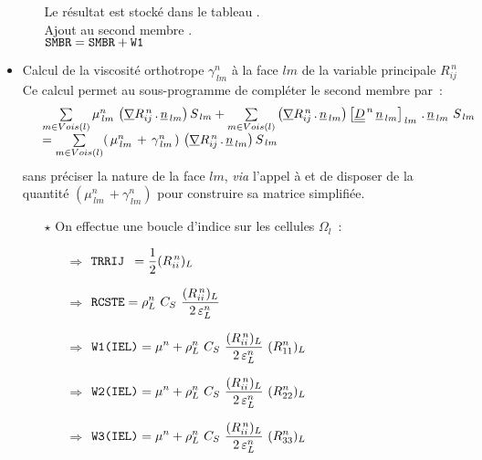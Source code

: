 \begin{itemize}
\begin{itemize}
Le résultat est stocké dans le tableau .\\
Ajout au second membre .\\
$\text{\texttt{SMBR}} = \text{\texttt{SMBR}} + \text{\texttt{W1}}$
\end{itemize}
\item Calcul de la viscosité orthotrope $\gamma^n_{\,lm}$ à la face $lm$ de la variable principale
$R^{\,n}_{ij}$\\
Ce calcul permet au sous-programme  de compléter le second membre
 par~:
\begin{equation}
\begin{array} {ll}
& \sum\limits_{m\in Vois(l)}
\mu^n_{\,lm}\,\left(\underline{\nabla}{R}^{\,n}_{ij}\,.\,\underline{n}_{\,lm}\right)S_{\,lm}
 + \sum\limits_{m\in Vois(l)} \left(\underline{\nabla}{R}^{\,n}_{ij}
\,.\,\underline{n}_{\,lm}\right)\left[\underline{\underline{D}}^{\,n}\,\underline{n}_{\,lm}\right]_{\,lm}\,.\,\underline{n}_{\,lm}\
S_{\,lm}\\
& = \sum\limits_{m\in Vois(l)}(\,\mu^n_{\,lm}\, + \,\gamma^n_{\,lm}\,)\,\left(\underline{\nabla}{R}^{\,n}_{ij}\,.\,\underline{n}_{\,lm}\right)S_{\,lm}
\end{array}
\end{equation}
sans préciser la nature de la face $lm$, {\it via} l'appel à   et de disposer de la quantité
$(\mu^n_{\,lm}\, + \gamma^n_{\,lm})$ pour construire sa
matrice simplifiée.\\
\begin{itemize}
\item [$\star$] On effectue une boucle d'indice  sur les cellules
$\Omega_l$~:
\begin{itemize}
\item [$\Rightarrow$] $\displaystyle \text{\texttt{TRRIJ }}= \frac{1}{2} (R^{\,n}_{ii})_L $
\item [$\Rightarrow$] $\displaystyle \var{RCSTE} = \rho^n_L \ C_S \ \frac{ (R^{\,n}_{ii})_L}{2\,\varepsilon^n_L} $
\item [$\Rightarrow$] $\displaystyle \text{\texttt{W1(IEL)}} = \mu^n +\rho^n_L \ C_S \ \frac{
(R^{\,n}_{ii})_L}{2\,\varepsilon^n_L}\ (R^n_{11})_L$
\item [$\Rightarrow$] $\displaystyle \var{W2(IEL)} = \mu^n + \rho^n_L \ C_S \ \frac{ (R^{\,n}_{ii})_L}{2\,\varepsilon^n_L}\ (R^n_{22})_L$
\item [$\Rightarrow$] $\displaystyle \var{W3(IEL)} = \mu^n + \rho^n_L \ C_S \ \frac{ (R^{\,n}_{ii})_L}{2\,\varepsilon^n_L}\ (R^n_{33})_L$
\end{itemize}


\end{itemize}
\end{itemize}

